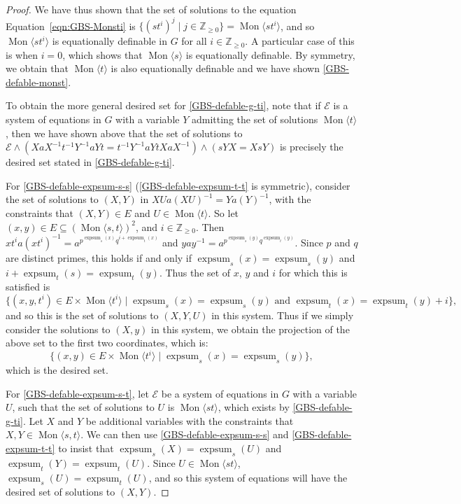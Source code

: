\documentclass[11pt]{amsart}
\theoremstyle{definition}
\numberwithin{theorem}{section}
\DeclareMathOperator{\Mon}{Mon}
\DeclareMathOperator{\expsum}{expsum}
\newcommand{\Z}{\mathbb{Z}}
\begin{document}
\begin{proof}
We have thus shown that the set of solutions to the equation
			Equation~\eqref{eqn:GBS-Monsti} is \(\{(st^i)^j \mid j \in \Z_{\geq 0}\} =
			\Mon \langle st^i \rangle\), and so \(\Mon\langle st^i \rangle\) is
			equationally definable in \(G\) for all \(i \in \Z_{\geq 0}\). A
			particular case of this is when \(i = 0\), which shows that
			\(\Mon \langle s \rangle\) is equationally definable. By
			symmetry, we obtain that \(\Mon \langle t \rangle\) is also
			equationally definable and we have shown \eqref{GBS-defable-monst}.

			To obtain the more
			general desired set for \eqref{GBS-defable-g-ti}, note that if \(\mathcal E\) is a
			system of equations in \(G\) with a variable \(Y\) admitting the
			set of solutions \(\Mon\langle t \rangle\), then we have shown
			above that the set of solutions to \(\mathcal E \wedge (XaX^{-1}
			t^{-1} Y^{-1} a Y t = t^{-1} Y^{-1} a Y t XaX^{-1}) \wedge (sY X =
			XsY)\) is precisely the desired set stated in \eqref{GBS-defable-g-ti}.

For \eqref{GBS-defable-expsum-s-s} (\eqref{GBS-defable-expsum-t-t}
			is symmetric), consider the set of solutions to \((X, Y)\) in \( X
			U a(XU)^{-1} = Y a (Y)^{-1}\), with the constraints that \((X, Y)
			\in E\) and \(U \in \Mon \langle t \rangle\).  So let \((x, y) \in
			E \subseteq (\Mon \langle s, t \rangle)^2\), and \(i \in \Z_{\geq
			0}\). Then \(xt^i a (xt^i)^{-1} = a^{p^{\expsum_s(x)}q^{i +
			\expsum_t(x)}}\) and \(y a y^{-1} = a^{p^{\expsum_s(y)}
			q^{\expsum_t(y)}}\). Since \(p\) and \(q\) are distinct primes,
			this holds if and only if \(\expsum_s(x) = \expsum_s(y)\) and \(i +
			\expsum_t(s) = \expsum_t(y)\).  Thus the set of \(x\), \(y\) and
			\(i\) for which this is satisfied is
			\[
				\{(x, y, t^i) \in E \times \Mon\langle t^i \rangle \mid
				\expsum_s(x) = \expsum_s(y) \text{ and } \expsum_t(x) =
		\expsum_t(y) + i\},
			\]
			and so this is the set of solutions to \((X, Y, U)\) in this system.
			Thus if we simply consider the solutions to \((X, y)\) in this
			system, we obtain the projection of the above set to the first two
			coordinates, which is:
			\[
				\{(x, y) \in E \times \Mon\langle t^i \rangle \mid
		\expsum_s(x) = \expsum_s(y)\},
			\]
	which is the desired set.
			
	For \eqref{GBS-defable-expsum-s-t}, let \(\mathcal E\) be a system of equations in \(G\) with
			a variable \(U\), such that the set of solutions to \(U\) is \(\Mon
			\langle st \rangle\), which exists by \eqref{GBS-defable-g-ti}.  Let \(X\) and \(Y\) be
			additional variables with the constraints that \(X, Y \in \Mon
			\langle s, t \rangle\). We can then use \eqref{GBS-defable-expsum-s-s} and \eqref{GBS-defable-expsum-t-t} to insist
			that \(\expsum_s(X) = \expsum_s(U)\) and \(\expsum_t(Y) = 
			\expsum_t(U)\). Since \(U \in \Mon\langle st \rangle\),
			\(\expsum_s(U) = \expsum_t(U)\), and so this system of
			equations will have the desired set of solutions to
			\((X, Y)\).
	\end{proof}
\end{document}

